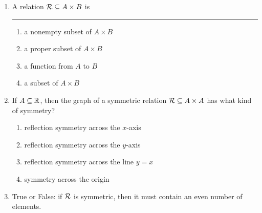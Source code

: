 \pagestyle{empty}


\begin{enumerate}
  \item A relation $\mathcal{R} \subseteq A \times B$ is \rule{3cm}{0.15mm}
    \begin{enumerate}
      \item a nonempty subset of $A\times B$
      \item a proper subset of $A\times B$
      \item a function from $A$ to $B$
      \item a subset of $A\times B$
    \end{enumerate}

  \item If $A\subseteq\mathbb{R}$, then the graph of a symmetric relation $\mathcal{R}\subseteq A\times A$ has what kind of symmetry?
  \begin{enumerate}
    \item reflection symmetry across the $x$-axis
    \item reflection symmetry across the $y$-axis
    \item reflection symmetry across the line $y=x$
    \item symmetry across the origin
  \end{enumerate}

  \item True or False: if $\mathcal{R}$ is symmetric, then it must contain an even number of elements.
\end{enumerate}



